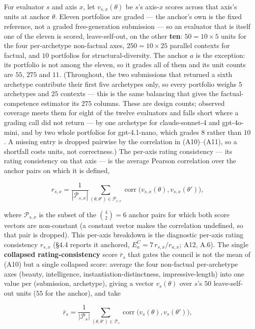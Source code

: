 For evaluator \(s\) and axis \(x\), let \(v_{s,x}(\theta)\) be \(s\)'s axis-\(x\) scores across that axis's units at anchor \(\theta\). Eleven portfolios are graded --- the anchor's own is the fixed reference, not a graded free-generation submission --- so an evaluator that is itself one of the eleven is scored, leave-self-out, on the other \textbf{ten}: \(50=10\times5\) units for the four per-archetype non-factual axes, \(250=10\times25\) parallel contexts for factual, and \(10\) portfolios for structural-diversity. The anchor \(a\) is the exception: its portfolio is not among the eleven, so it grades all of them and its unit counts are \(55\), \(275\) and \(11\). (Throughout, the two submissions that returned a sixth archetype contribute their first five archetypes only, so every portfolio weighs \(5\) archetypes and \(25\) contexts --- this is the same balancing that gives the factual-competence estimator its \(275\) columns. These are design counts; observed coverage meets them for eight of the twelve evaluators and falls short where a grading call did not return --- by one archetype for claude-sonnet-4 and gpt-4o-mini, and by two whole portfolios for gpt-4.1-nano, which grades \(8\) rather than \(10\). A missing entry is dropped pairwise by the correlation in (A10)--(A11), so a shortfall costs units, not correctness.) The per-axis rating consistency --- its rating consistency on that axis --- is the average Pearson correlation over the anchor pairs on which it is defined,

\[ r_{s,x}=\frac{1}{|\mathcal P_{s,x}|}\sum_{(\theta,\theta')\in\mathcal P_{s,x}}\operatorname{corr}\!\big(v_{s,x}(\theta),v_{s,x}(\theta')\big), \tag{A10}\]

where \(\mathcal P_{s,x}\) is the subset of the \(\binom{4}{2}=6\) anchor pairs for which both score vectors are non-constant (a constant vector makes the correlation undefined, so that pair is dropped). This per-axis breakdown is the diagnostic per-axis rating consistency \(r_{s,x}\) (§4.4 reports it anchored, \(E^{C}_a = 7\,r_{s,x}/r_{a,x}\); A12, A.6). The single \textbf{collapsed rating-consistency} score \(\bar r_s\) that gates the council is not the mean of (A10) but a single collapsed score: average the four non-factual per-archetype axes (beauty, intelligence, instantiation-distinctness, impressive-length) into one value per (submission, archetype), giving a vector \(v_{s}(\theta)\) over \(s\)'s \(50\) leave-self-out units (\(55\) for the anchor), and take

\[ \bar r_s=\frac{1}{|\mathcal P_{s}|}\sum_{(\theta,\theta')\in\mathcal P_{s}}\operatorname{corr}\!\big(v_{s}(\theta),v_{s}(\theta')\big), \tag{A11}\]

